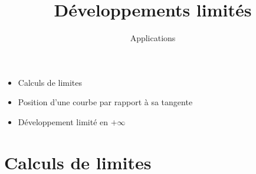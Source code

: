 







\title{{\bf Développements limités}}
\subtitle{Applications}

\begin{frame}
  
  \debutmontitre

  \pause

{\footnotesize
\hfill
{}
\begin{minipage}{0.6\textwidth}
  \begin{itemize}
    \item<3-> Calculs de limites
    \item<4-> Position d'une courbe par rapport à sa tangente
    \item<5-> Développement limité en $+\infty$
  \end{itemize}
\end{minipage}
}

\end{frame}

\setcounter{framenumber}{0}






\section{Calculs de limites}

